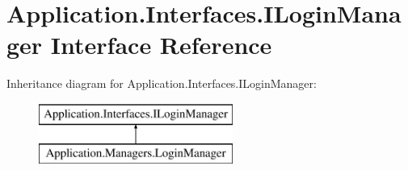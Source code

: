 \hypertarget{interface_application_1_1_interfaces_1_1_i_login_manager}{}\section{Application.\+Interfaces.\+I\+Login\+Manager Interface Reference}
\label{interface_application_1_1_interfaces_1_1_i_login_manager}
Inheritance diagram for Application.\+Interfaces.\+I\+Login\+Manager\+:\begin{figure}[H]
\begin{center}
\leavevmode
\includegraphics[height=2.000000cm]{interface_application_1_1_interfaces_1_1_i_login_manager}
\end{center}
\end{figure}
